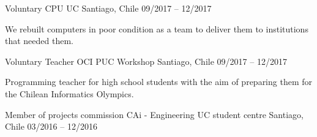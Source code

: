 \begin{cventries}
  \cventry
  {Voluntary} %
  {CPU UC} %
  {Santiago, Chile} %
  {09/2017 – 12/2017} %
  {
    \begin{cvitems} %
      \item {We rebuilt computers in poor condition as a team to deliver them to institutions that needed them.}
    \end{cvitems}
  }

  \cventry
  {Voluntary Teacher} %
  {OCI PUC Workshop} %
  {Santiago, Chile} %
  {09/2017 – 12/2017} %
  {
    \begin{cvitems} %
      \item {Programming teacher for high school students with the aim of preparing them for the Chilean Informatics Olympics.}
    \end{cvitems}
  }

  \cventry
  {Member of projects commission} %
  {CAi - Engineering UC student centre} %
  {Santiago, Chile} %
  {03/2016 – 12/2016} %
  {}

\end{cventries}
